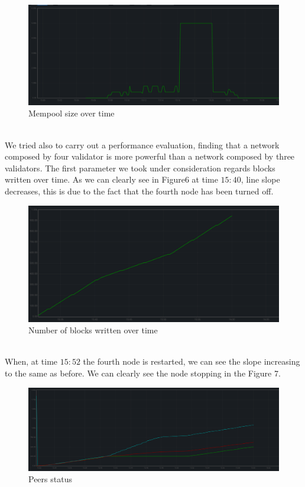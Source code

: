 \documentclass{article}
\begin{document}
	\begin{figure}[htbp]
    \centering
    \includegraphics[width=1\textwidth]{mempoolsize} 
	\caption{Mempool size over time}
	\end{figure}\\
	We tried also to carry out a performance evaluation, finding that a network composed by four validator is more powerful than a network composed by three validators. The first parameter we took under consideration regards blocks written over time. As we can clearly see in Figure6 at time $15:40$, line slope decreases, this is due to the fact that the fourth node has been turned off.
	\begin{figure}[htbp]
    \centering
    \includegraphics[width=1\textwidth]{block_count2} 
	\caption{Number of blocks written over time}
	\end{figure}\\
	When, at time $15:52$ the fourth node is restarted, we can see the slope increasing to the same as before. We can clearly see the node stopping in the Figure 7.
	\begin{figure}[htbp]
    \centering
    \includegraphics[width=1\textwidth]{peers} 
	\caption{Peers status}
	\end{figure}\\
\end{document}
